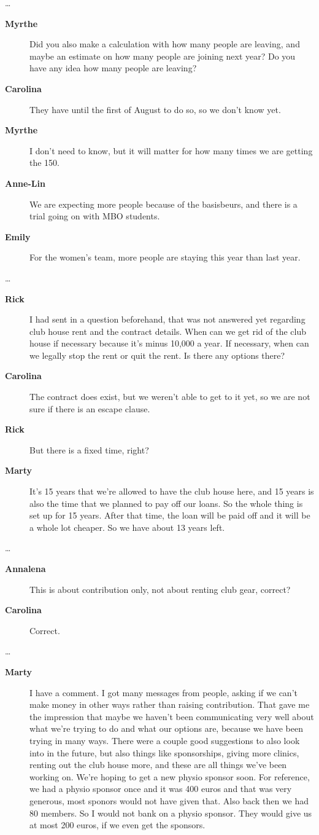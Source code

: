 \documentclass[12pt, a4paper]{article}
\newcommand{\speak}[2]{\begin{description}\item[\textbf{#1}]#2\end{description}}
\begin{document}
\dots

\speak{Myrthe}{Did you also make a calculation with how many people are leaving, and maybe an estimate on how many people are joining next year? Do you have any idea how many people are leaving?}

\speak{Carolina}{They have until the first of August to do so, so we don't know yet.}

\speak{Myrthe}{I don't need to know, but it will matter for how many times we are getting the 150.}

\speak{Anne-Lin}{We are expecting more people because of the basisbeurs, and there is a trial going on with MBO students.}

\speak{Emily}{For the women's team, more people are staying this year than last year.}

\dots

\speak{Rick}{I had sent in a question beforehand, that was not answered yet regarding club house rent and the contract details. When can we get rid of the club house if necessary because it's minus 10,000 a year. If necessary, when can we legally stop the rent or quit the rent. Is there any options there?}

\speak{Carolina}{The contract does exist, but we weren't able to get to it yet, so we are not sure if there is an escape clause.}

\speak{Rick}{But there is a fixed time, right?}

\speak{Marty}{It's 15 years that we're allowed to have the club house here, and 15 years is also the time that we planned to pay off our loans. So the whole thing is set up for 15 years. After that time, the loan will be paid off and it will be a whole lot cheaper. So we have about 13 years left.}

\dots

\speak{Annalena}{This is about contribution only, not about renting club gear, correct?}

\speak{Carolina}{Correct.}

\dots

\speak{Marty}{I have a comment. I got many messages from people, asking if we can't make money in other ways rather than raising contribution. That gave me the impression that maybe we haven't been communicating very well about what we're trying to do and what our options are, because we have been trying in many ways. There were a couple good suggestions to also look into in the future, but also things like sponsorships, giving more clinics, renting out the club house more, and these are all things we've been working on. We're hoping to get a new physio sponsor soon. For reference, we had a physio sponsor once and it was 400 euros and that was very generous, most sponors would not have given that. Also back then we had 80 members. So I would not bank on a physio sponsor. They would give us at most 200 euros, if we even get the sponsors.}
\end{document}
